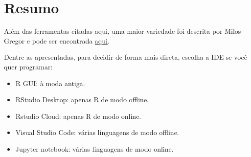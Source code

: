   \section{Resumo}
  	Além das ferramentas citadas aqui, uma maior variedade foi descrita por Milos Gregor \cite{Gregor2018} e pode ser encontrada \href{https://stagraph.com/Post?Id=31&Title=Powered+By+R}{aqui}.
  	
  	Dentre as apresentadas, para decidir de forma mais direta, escolha a IDE se você quer programar:
  	\begin{itemize}
  		\item R GUI: à moda antiga.
  		\item RStudio Desktop: apenas R de modo offline.
  		\item Rstudio Cloud: apenas R de modo online.
  		\item Visual Studio Code: várias linguagens de modo offline.
  		\item Jupyter notebook: várias linguagens de modo online.
  	\end{itemize}


